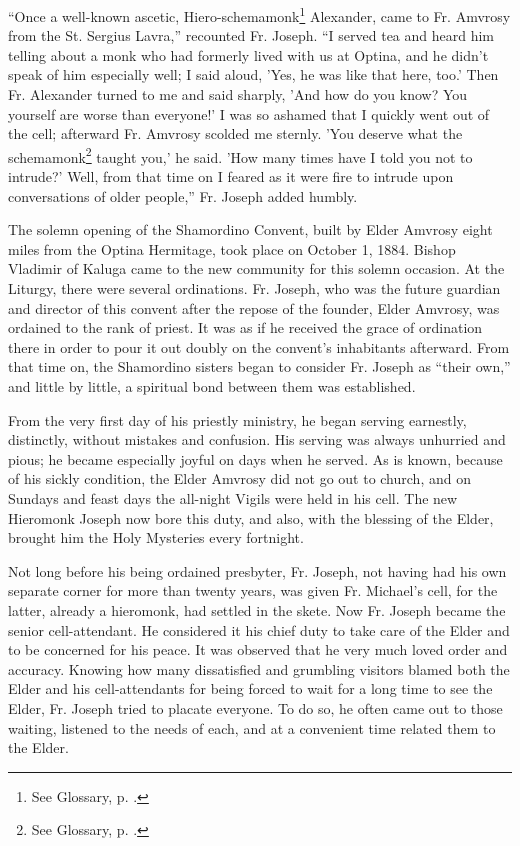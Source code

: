 “Once a well-known ascetic, Hiero-schemamonk\footnote{See Glossary, p. \pageref{hiero-schemamonk}.} Alexander, came to Fr. Amvrosy from the St. Sergius Lavra,” recounted Fr. Joseph. “I served tea and heard him telling about a monk who had formerly lived with us at Optina, and he didn't speak of him especially well; I said aloud, 'Yes, he was like that here, too.' Then Fr. Alexander turned to me and said sharply, 'And how do you know? You yourself are worse than everyone!' I was so ashamed that I quickly went out of the cell; afterward Fr. Amvrosy scolded me sternly. 'You deserve what the schemamonk\footnote{See Glossary, p. \pageref{schemamonk}.} taught you,' he said. 'How many times have I told you not to intrude?' Well, from that time on I feared as it were fire to intrude upon conversations of older people,” Fr. Joseph added humbly.

The solemn opening of the Shamordino Convent, built by Elder Amvrosy eight miles from the Optina Hermitage, took place on October 1, 1884. Bishop Vladimir of Kaluga came to the new community for this solemn occasion. At the Liturgy, there were several ordinations. Fr. Joseph, who was the future guardian and director of this convent after the repose of the founder, Elder Amvrosy, was ordained to the rank of priest. It was as if he received the grace of ordination there in order to pour it out doubly on the convent's inhabitants afterward. From that time on, the Shamordino sisters began to consider Fr. Joseph as “their own,” and little by little, a spiritual bond between them was established.

From the very first day of his priestly ministry, he began serving earnestly, distinctly, without mistakes and confusion. His serving was always unhurried and pious; he became especially joyful on days when he served. As is known, because of his sickly condition, the Elder Amvrosy did not go out to church, and on Sundays and feast days the all-night Vigils were held in his cell. The new Hieromonk Joseph now bore this duty, and also, with the blessing of the Elder, brought him the Holy Mysteries every fortnight.

Not long before his being ordained presbyter, Fr. Joseph, not having had his own separate corner for more than twenty years, was given Fr. Michael's cell, for the latter, already a hieromonk, had settled in the skete. Now Fr. Joseph became the senior cell-attendant. He considered it his chief duty to take care of the Elder and to be concerned for his peace. It was observed that he very much loved order and accuracy. Knowing how many dissatisfied and grumbling visitors blamed both the Elder and his cell-attendants for being forced to wait for a long time to see the Elder, Fr. Joseph tried to placate everyone. To do so, he often came out to those waiting, listened to the needs of each, and at a convenient time related them to the Elder.

